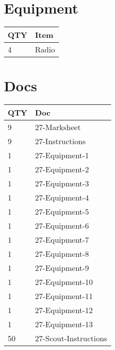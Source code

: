 \documentclass[10pt]{article}
\begin{document}
	\begin{multicols}{2}

		\section*{\faWrench \: Equipment}

		
	\begin{center}
			\begin{tabular}{p{2cm}p{4cm}}


				\textbf{QTY} & \textbf{Item} \\\toprule
												4&Radio\\\midrule
								\end{tabular}

			\end{center}

		
		\vfill\null
		\columnbreak

			\section*{\faFile \: Docs}
		 	\begin{center}
			\begin{tabular}{p{2cm}p{4cm}}

			\textbf{QTY} & \textbf{Doc} \\\toprule
										9&27-Marksheet\\\midrule
										9&27-Instructions\\\midrule
										1&27-Equipment-1\\\midrule
										1&27-Equipment-2\\\midrule
										1&27-Equipment-3\\\midrule
										1&27-Equipment-4\\\midrule
										1&27-Equipment-5\\\midrule
										1&27-Equipment-6\\\midrule
										1&27-Equipment-7\\\midrule
										1&27-Equipment-8\\\midrule
										1&27-Equipment-9\\\midrule
										1&27-Equipment-10\\\midrule
										1&27-Equipment-11\\\midrule
										1&27-Equipment-12\\\midrule
										1&27-Equipment-13\\\midrule
										50&27-Scout-Instructions\\\midrule
							\end{tabular}
			\end{center}
	

		\vfill\null

		\end{multicols}
\end{document}
